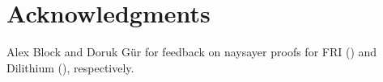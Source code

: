 \chapter{Acknowledgments}

Alex Block and Doruk G\"ur for feedback on naysayer proofs for FRI () and Dilithium (), respectively.

